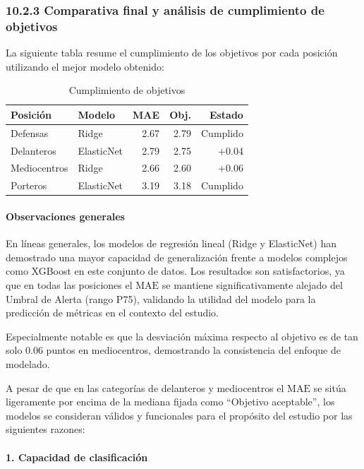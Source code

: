 \subsubsection{10.2.3 Comparativa final y análisis de cumplimiento de objetivos}

La siguiente tabla resume el cumplimiento de los objetivos por 
cada posición utilizando el mejor modelo obtenido:

\begin{table}[H]
\centering
\small
\begin{tabular}{|l|l|r|r|r|}
\hline
\textbf{Posición} & \textbf{Modelo} & \textbf{MAE} & 
\textbf{Obj.} & \textbf{Estado} \\
\hline
Defensas & Ridge & 2.67 & 2.79 & Cumplido \\
Delanteros & ElasticNet & 2.79 & 2.75 & +0.04 \\
Mediocentros & Ridge & 2.66 & 2.60 & +0.06 \\
Porteros & ElasticNet & 3.19 & 3.18 & Cumplido \\
\hline
\end{tabular}
\caption{Cumplimiento de objetivos}
\end{table}


\paragraph{Observaciones generales}

En líneas generales, los modelos de regresión lineal (Ridge y 
ElasticNet) han demostrado una mayor capacidad de generalización 
frente a modelos complejos como XGBoost en este conjunto de datos. 
Los resultados son satisfactorios, ya que en todas las posiciones 
el $\mathrm{MAE}$ se mantiene significativamente alejado 
del Umbral de Alerta (rango P75), validando la utilidad del 
modelo para la predicción de métricas en el contexto del estudio.

Especialmente notable es que la desviación máxima respecto al 
objetivo es de tan solo 0.06 puntos en mediocentros, demostrando 
la consistencia del enfoque de modelado.

A pesar de que en las categorías de delanteros y mediocentros el 
$\mathrm{MAE}$ se sitúa ligeramente por encima de la mediana fijada 
como ``Objetivo aceptable'', los modelos se consideran 
válidos y funcionales para el propósito del estudio por 
las siguientes razones:

\paragraph{1. Capacidad de clasificación}

